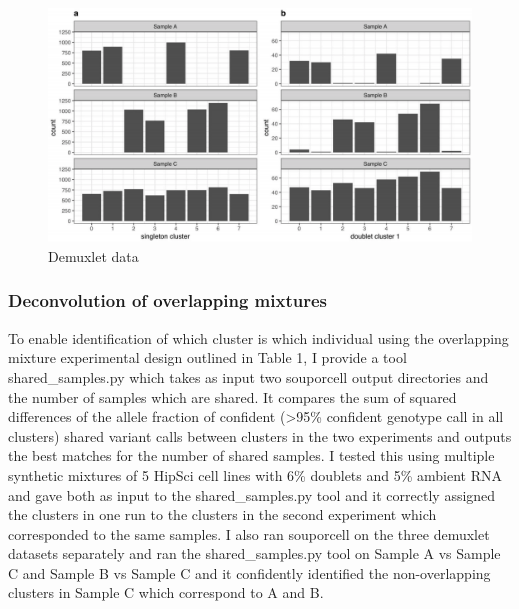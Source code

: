 \begin{figure}[htbp!]
\caption{Demuxlet data}
\label{figure:demuxlet}
\begin{centering}
\includegraphics[width=\textwidth]{demuxletdata.png} 
\end{centering}

\end{figure}

\subsubsection{Deconvolution of overlapping mixtures}

\par{
To enable identification of which cluster is which individual using the overlapping mixture experimental
design outlined in Table 1, I provide a tool shared\_samples.py which takes as input two souporcell
output directories and the number of samples which are shared. It compares the sum of squared
differences of the allele fraction of confident (>95\% confident genotype call in all clusters) shared variant
calls between clusters in the two experiments and outputs the best matches for the number of shared
samples. I tested this using multiple synthetic mixtures of 5 HipSci
cell lines with 6\% doublets and 5\% ambient RNA and gave both as input to the shared\_samples.py tool
and it correctly assigned the clusters in one run to the clusters in the second experiment which
corresponded to the same samples. I also ran souporcell on the three demuxlet datasets separately and
ran the shared\_samples.py tool on Sample A vs Sample C and Sample B vs Sample C and it confidently
identified the non-overlapping clusters in Sample C which correspond to A and B. 
}



